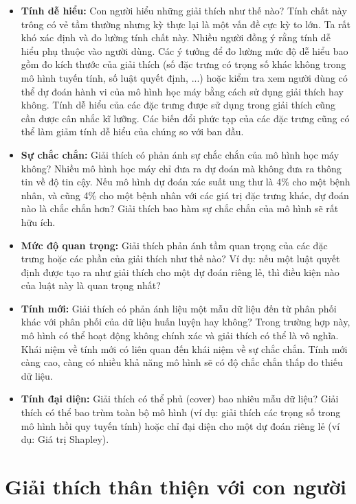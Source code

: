\begin{itemize}
    \item \textbf{Tính dễ hiểu:} Con người hiểu những giải thích như thế nào? Tính chất này trông có vẻ tầm thường nhưng kỳ thực lại là một vấn đề cực kỳ to lớn. Ta rất khó xác định và đo lường tính chất này. Nhiều người đồng ý rằng tính dễ hiểu phụ thuộc vào người dùng. Các ý tưởng để đo lường mức độ dễ hiểu bao gồm đo kích thước của giải thích (số đặc trưng có trọng số khác không trong mô hình tuyến tính, số luật quyết định, ...) hoặc kiểm tra xem người dùng có thể dự đoán hành vi của mô hình học máy bằng cách sử dụng giải thích hay không. Tính dễ hiểu của các đặc trưng được sử dụng trong giải thích cũng cần được cân nhắc kĩ lưỡng. Các biến đổi phức tạp của các đặc trưng cũng có thể làm giảm tính dễ hiểu của chúng so với ban đầu.
    
    \item \textbf{Sự chắc chắn:} Giải thích có phản ánh sự chắc chắn của mô hình học máy không? Nhiều mô hình học máy chỉ đưa ra dự đoán mà không đưa ra thông tin về độ tin cậy. Nếu mô hình dự đoán xác suất ung thư là 4\% cho một bệnh nhân, và cũng 4\% cho một bệnh nhân với các giá trị đặc trưng khác, dự đoán nào là chắc chắn hơn? Giải thích bao hàm sự chắc chắn của mô hình sẽ rất hữu ích.
    
    \item \textbf{Mức độ quan trọng:} Giải thích phản ánh tầm quan trọng của các đặc trưng hoặc các phần của giải thích như thế nào? Ví dụ: nếu một luật quyết định được tạo ra như giải thích cho một dự đoán riêng lẻ, thì điều kiện nào của luật này là quan trọng nhất?
    
    \item \textbf{Tính mới:} Giải thích có phản ánh liệu một mẫu dữ liệu đến từ phân phối khác với phân phối của dữ liệu huấn luyện hay không? Trong trường hợp này, mô hình có thể hoạt động không chính xác và giải thích có thể là vô nghĩa. Khái niệm về tính mới có liên quan đến khái niệm về sự chắc chắn. Tính mới càng cao, càng có nhiều khả năng mô hình sẽ có độ chắc chắn thấp do thiếu dữ liệu.
    
    \item \textbf{Tính đại diện:} Giải thích có thể phủ (cover) bao nhiêu mẫu dữ liệu? Giải thích có thể bao trùm toàn bộ mô hình (ví dụ: giải thích các trọng số trong mô hình hồi quy tuyến tính) hoặc chỉ đại diện cho một dự đoán riêng lẻ (ví dụ: Giá trị Shapley).
\end{itemize}

\clearpage

\section{Giải thích thân thiện với con người}

